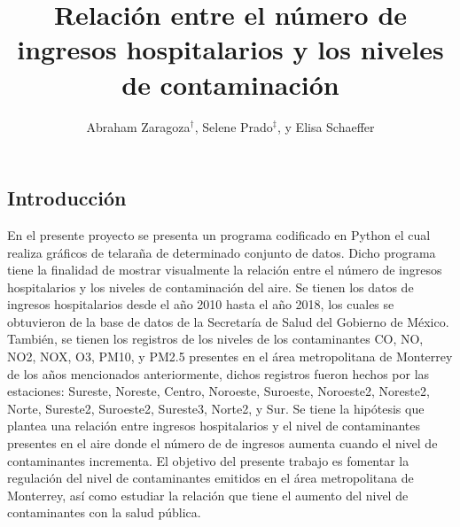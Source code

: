 \documentclass[a0]{sciposter} %
\title{Relación entre el número de ingresos hospitalarios y los niveles de contaminación}
\author{Abraham Zaragoza$^\dagger$, Selene Prado$^\ddagger$, y Elisa Schaeffer}
\institute {Posgrado en Ingeniería de Sistemas}
\begin{document}
  
\maketitle
\begin{abstract}

\end{abstract}

\begin{multicols}{2} 

\section{Introducción}

En el presente proyecto se presenta un programa codificado en Python el cual realiza gráficos de telaraña de determinado conjunto de datos. Dicho programa tiene la finalidad de mostrar visualmente la relación entre el número de ingresos hospitalarios y los niveles de contaminación del aire.
Se tienen los datos de ingresos hospitalarios desde el año 2010 hasta el año 2018, los cuales se obtuvieron de la base de datos de la Secretaría de Salud del Gobierno de México. También, se tienen los registros de los niveles de los contaminantes CO, NO, NO2, NOX, O3, PM10, y PM2.5 presentes en el área metropolitana de Monterrey de los años mencionados anteriormente, dichos registros fueron hechos por las estaciones: Sureste, Noreste, Centro, Noroeste, Suroeste, Noroeste2, Noreste2, Norte, Sureste2, Suroeste2, Sureste3, Norte2, y Sur.
Se tiene la hipótesis que plantea una relación entre ingresos hospitalarios y el nivel de contaminantes presentes en el aire donde el número de de ingresos aumenta cuando el nivel de contaminantes incrementa. 
El objetivo del presente trabajo es fomentar la regulación del nivel de contaminantes emitidos en el área metropolitana de Monterrey, así como estudiar la relación que tiene el aumento del nivel de contaminantes con la salud pública.


\end{multicols}
\end{document}

